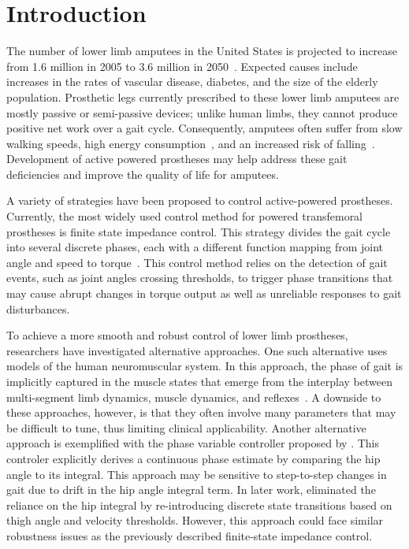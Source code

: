 \section{Introduction}

The number of lower limb amputees in the United States is projected to increase
from 1.6 million in 2005 to 3.6 million in 2050~\citep{ziegler2008estimating}.
Expected causes include increases in the rates of vascular disease, diabetes,
and the size of the elderly population. Prosthetic legs currently prescribed to
these lower limb amputees are mostly passive or semi-passive devices; unlike
human limbs, they cannot produce positive net work over a gait cycle.
Consequently, amputees often suffer from slow walking speeds, high energy
consumption~\citep{waters1976energy}, and an increased risk of
falling~\citep{miller2001prevalence}. Development of active powered prostheses
may help address these gait deficiencies and improve the quality of life for
amputees.

A variety of strategies have been proposed to control active-powered prostheses.
Currently, the most widely used control method for powered transfemoral
prostheses is finite state impedance control. This strategy divides the gait
cycle into several discrete phases, each with a different function mapping from
joint angle and speed to torque~\citep{lawson2014robotic}. This control method
relies on the detection of gait events, such as joint angles crossing
thresholds, to trigger phase transitions that may cause abrupt changes in torque
output as well as unreliable responses to gait disturbances. 

To achieve a more smooth and robust control of lower limb prostheses,
researchers have investigated alternative approaches. One such alternative uses
models of the human neuromuscular system. In this approach, the phase of gait is
implicitly captured in the muscle states that emerge from the interplay between
multi-segment limb dynamics, muscle dynamics, and
reflexes~\citep{eilenberg2010control, thatte2016toward}. A downside to these
approaches, however, is that they often involve many parameters that may be
difficult to tune, thus limiting clinical applicability. Another alternative
approach is exemplified with the phase variable controller proposed by
\citet{quintero2016preliminary}. This controler explicitly derives a continuous
phase estimate by comparing the hip angle to its integral. This approach may be
sensitive to step-to-step changes in gait due to drift in the hip angle integral
term. In later work, \citet{rezazadeh2018phase} eliminated the reliance on the
hip integral by re-introducing discrete state transitions based on thigh angle
and velocity thresholds. However, this approach could face similar robustness
issues as the previously described finite-state impedance control.

